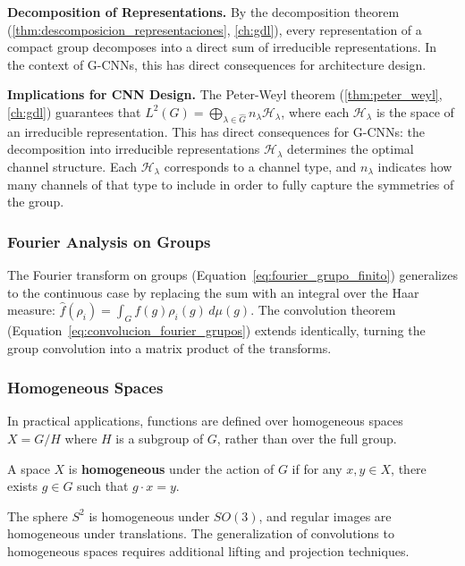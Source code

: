 \textbf{Decomposition of Representations.} By the decomposition theorem (\autoref{thm:descomposicion_representaciones}, \autoref{ch:gdl}), every representation of a compact group decomposes into a direct sum of irreducible representations. In the context of G-\glspl{CNN}, this has direct consequences for architecture design.

\textbf{Implications for CNN Design.} The Peter-Weyl theorem (\autoref{thm:peter_weyl}, \autoref{ch:gdl}) guarantees that $L^2(G) = \bigoplus_{\lambda \in \widehat{G}} n_\lambda \mathcal{H}_\lambda$, where each $\mathcal{H}_\lambda$ is the space of an irreducible representation. This has direct consequences for G-\glspl{CNN}: the decomposition into irreducible representations $\mathcal{H}_\lambda$ determines the optimal channel structure. Each $\mathcal{H}_\lambda$ corresponds to a channel type, and $n_\lambda$ indicates how many channels of that type to include in order to fully capture the symmetries of the group.

\subsubsection{Fourier Analysis on Groups}

The Fourier transform on groups (Equation~\ref{eq:fourier_grupo_finito}) generalizes to the continuous case by replacing the sum with an integral over the Haar measure: $\hat{f}(\rho_i) = \int_G f(g) \rho_i(g) \, d\mu(g)$. The convolution theorem (Equation~\ref{eq:convolucion_fourier_grupos}) extends identically, turning the group convolution into a matrix product of the transforms.

\subsubsection{Homogeneous Spaces}

In practical applications, functions are defined over homogeneous spaces $X = G/H$ where $H$ is a subgroup of $G$, rather than over the full group.

\begin{definition}
A space $X$ is \textbf{homogeneous} under the action of $G$ if for any $x, y \in X$, there exists $g \in G$ such that $g \cdot x = y$.
\end{definition}

The sphere $S^2$ is homogeneous under $SO(3)$, and regular images are homogeneous under translations. The generalization of convolutions to homogeneous spaces requires additional lifting and projection techniques.

